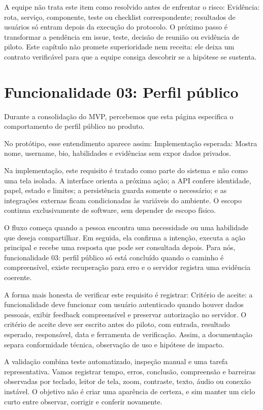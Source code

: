 \documentclass[12pt,oneside,a4paper,article]{abntex2}
\begin{document}
A equipe não trata este item como resolvido antes de enfrentar o risco: Evidência: rota, serviço, componente, teste ou checklist correspondente; resultados de usuários só entram depois da execução do protocolo. O próximo passo é transformar a pendência em issue, teste, decisão de reunião ou evidência de piloto. Este capítulo não promete superioridade nem receita: ele deixa um contrato verificável para que a equipe consiga descobrir se a hipótese se sustenta.

\section{Funcionalidade 03: Perfil público}
Durante a consolidação do MVP, percebemos que esta página especifica o comportamento de perfil público no produto.

No protótipo, esse entendimento aparece assim: Implementação esperada: Mostra nome, username, bio, habilidades e evidências sem expor dados privados.

Na implementação, este requisito é tratado como parte do sistema e não como uma tela isolada. A interface orienta a próxima ação; a API confere identidade, papel, estado e limites; a persistência guarda somente o necessário; e as integrações externas ficam condicionadas às variáveis do ambiente. O escopo continua exclusivamente de software, sem depender de escopo físico.

O fluxo começa quando a pessoa encontra uma necessidade ou uma habilidade que deseja compartilhar. Em seguida, ela confirma a intenção, executa a ação principal e recebe uma resposta que pode ser consultada depois. Para nós, funcionalidade 03: perfil público só está concluído quando o caminho é compreensível, existe recuperação para erro e o servidor registra uma evidência coerente.

A forma mais honesta de verificar este requisito é registrar: Critério de aceite: a funcionalidade deve funcionar com usuário autenticado quando houver dados pessoais, exibir feedback compreensível e preservar autorização no servidor. O critério de aceite deve ser escrito antes do piloto, com entrada, resultado esperado, responsável, data e ferramenta de verificação. Assim, a documentação separa conformidade técnica, observação de uso e hipótese de impacto.

A validação combina teste automatizado, inspeção manual e uma tarefa representativa. Vamos registrar tempo, erros, conclusão, compreensão e barreiras observadas por teclado, leitor de tela, zoom, contraste, texto, áudio ou conexão instável. O objetivo não é criar uma aparência de certeza, e sim manter um ciclo curto entre observar, corrigir e conferir novamente.
\end{document}
